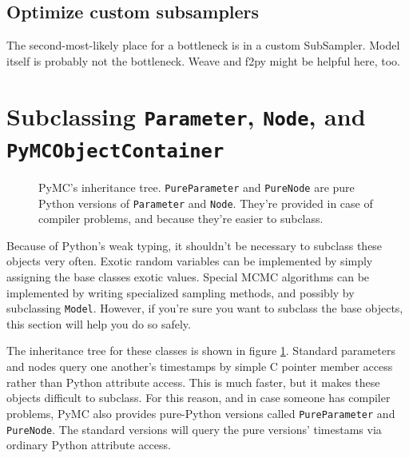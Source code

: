 \documentclass[]{book}
\begin{document}
\subsection{Optimize custom subsamplers}\label{sub:optimize_custom_subsamplers}
The second-most-likely place for a bottleneck is in a custom SubSampler. Model itself is probably not the bottleneck. Weave and f2py might be helpful here, too.

\section{Subclassing \texttt{Parameter}, \texttt{Node}, and \texttt{PyMCObjectContainer} }
\begin{center}
	\begin{figure}[hhhh]
		\centering
		\caption{PyMC's inheritance tree. \texttt{PureParameter} and \texttt{PureNode} are pure Python versions of \texttt{Parameter} and \texttt{Node}. They're provided in case of compiler problems, and because they're easier to subclass.}
		\label{fig:inheritance}
	\end{figure}
\end{center}

Because of Python's weak typing, it shouldn't be necessary to subclass these objects very often. Exotic random variables can be implemented by simply assigning the base classes exotic values. Special MCMC algorithms can be implemented by writing specialized sampling methods, and possibly by subclassing \texttt{Model}. However, if you're sure you want to subclass the base objects, this section will help you do so safely.

The inheritance tree for these classes is shown in figure \ref{fig:inheritance}. Standard parameters and nodes query one another's timestamps by simple C pointer member access rather than Python attribute access. This is much faster, but it makes these objects difficult to subclass. For this reason, and in case someone has compiler problems, PyMC also provides pure-Python versions called \texttt{PureParameter} and \texttt{PureNode}. The standard versions will query the pure versions' timestams via ordinary Python attribute access.
\end{document}
